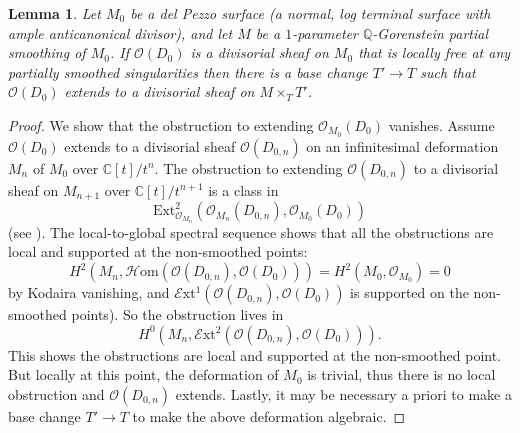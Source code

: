 \documentclass[JEP,XML,SOM,Unicode,NoFloatCountersInSection,published]{cedram}
\theoremstyle{plain}
\newtheorem{lemma}[theorem]{Lemma}
\theoremstyle{definition}
\newcommand\CC{{\mathbb C}}
\newcommand\QQ{{\mathbb Q}}
\newcommand\Oc{{\mathcal O}}
\newcommand\Ext{{\mathrm{Ext}}}
\begin{document}
\begin{lemma}\label{extendingdivisors}
Let $M_0$ be a del Pezzo surface (a normal, log terminal surface with ample anticanonical divisor), and let $M$ be a $1$-parameter $\QQ$-Gorenstein partial smoothing of $M_0$. If $\Oc(D_0)$ is a divisorial sheaf on $M_0$ that is locally free at any partially smoothed singularities then there is a base change $T'\to T$ such that $\Oc(D_0)$ extends to a divisorial sheaf on $M \times_T T'$.
\end{lemma}

\begin{proof}
We show that the obstruction to extending $\Oc_{M_0}(D_0)$ vanishes. Assume $\Oc(D_0)$ extends to a divisorial sheaf $\Oc(D_{0,n})$ on an infinitesimal deformation $M_n$ of $M_0$ over $\CC[t]/t^n$. The obstruction to extending $\Oc(D_{0,n})$ to a divisorial sheaf on $M_{n+1}$ over $\CC[t]/t^{n+1}$ is a class in
\[
\Ext^2_{\Oc_{M_n}}(\Oc_{M_n}(D_{0,n}),\Oc_{M_0}(D_0))
\]
(see \eg \cite[\href{https://stacks.math.columbia.edu/tag/08L8}{Tag 0ECH}]{stacks-project}). The local-to-global spectral sequence shows that all the obstructions are local and supported at the non-smoothed points: \[H^2(M_n,\mathcal{H}\mathrm{om}(\Oc(D_{0,n}),\Oc(D_0))) = H^2(M_0,\Oc_{M_0}) = 0\] by Kodaira vanishing, and $\mathcal{E}\mathrm{xt}^1(\Oc(D_{0,n}),\Oc(D_0))$ is supported on the non-smoothed points). So the obstruction lives in
\[
H^0(M_n,\mathcal{E}\mathrm{xt}^2(\Oc(D_{0,n}),\Oc(D_0))).
\]
This shows the obstructions are local and supported at the non-smoothed point. But locally at this point, the deformation of $M_0$ is trivial, thus there is no local obstruction and $\Oc(D_{0,n})$ extends. Lastly, it may be necessary a priori to make a base change $T'\to T$ to make the above deformation algebraic.
\end{proof}
\end{document}
